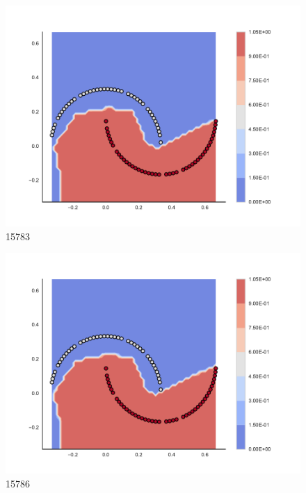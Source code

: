 \begin{subfigure}[b]{0.09\textwidth}
    \includegraphics[clip, trim=2.35cm 1.75cm 4.5cm 0cm,width=\textwidth]{img/convergence/15783.pdf}
    \caption{15783}
    \label{fig:convergence_15783}
\end{subfigure}
%
\begin{subfigure}[b]{0.09\textwidth}
    \includegraphics[clip, trim=2.35cm 1.75cm 4.5cm 0cm,width=\textwidth]{img/convergence/15786.pdf}
    \caption{15786}
    \label{fig:convergence_15786}
\end{subfigure}
%
